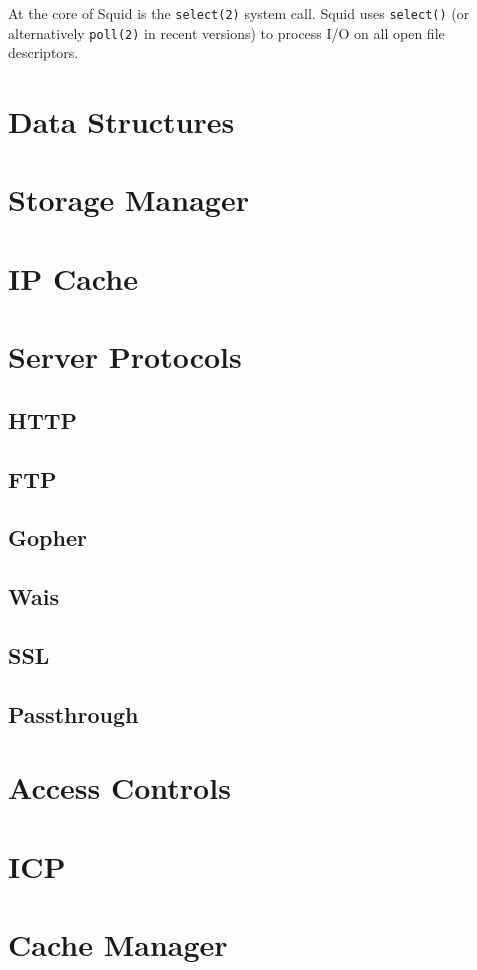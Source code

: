 At the core of Squid is the {\tt select(2)} system call.  Squid uses
{\tt select()} (or alternatively {\tt poll(2)} in recent versions) to 
process I/O on all open file descriptors.

\chapter{Data Structures}

\chapter{Storage Manager}

\chapter{IP Cache}

\chapter{Server Protocols}
\section{HTTP}
\section{FTP}
\section{Gopher}
\section{Wais}
\section{SSL}
\section{Passthrough}

\chapter{Access Controls}

\chapter{ICP}

\chapter{Cache Manager}

\newpage 


\nocite{rfc850}
\nocite{rfc1123}


